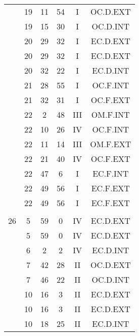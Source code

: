 \documentclass[12pt, a4paper]{article}
\begin{document}
\begin{multicols}{3}
{\begin{tabular}{c c c c c c}
	 	 	 	 & 19 & 11 & 54 & I & OC.D.EXT\\%
	 	 	 	 & 19 & 15 & 30 & I & OC.D.INT\\%
	 	 	 	 & 20 & 29 & 32 & I & EC.D.EXT\\%
	 	 	 	 & 20 & 29 & 32 & I & EC.D.EXT\\%
	 	 	 	 & 20 & 32 & 22 & I & EC.D.INT\\%
	 	 	 	 & 21 & 28 & 55 & I & OC.F.INT\\%
	 	 	 	 & 21 & 32 & 31 & I & OC.F.EXT\\%
	 	 	 	 & 22 & 2 & 48 & III & OM.F.INT\\%
	 	 	 	 & 22 & 10 & 26 & IV & OC.F.INT\\%
	 	 	 	 & 22 & 11 & 14 & III & OM.F.EXT\\%
	 	 	 	 & 22 & 21 & 40 & IV & OC.F.EXT\\%
	 	 	 	 & 22 & 47 & 6 & I & EC.F.INT\\%
	 	 	 	 & 22 & 49 & 56 & I & EC.F.EXT\\%
	 	 	 	 & 22 & 49 & 56 & I & EC.F.EXT\\%
	 	 	 	 & & & & & \\%
	 	 	 	26 & 5 & 59 & 0 & IV & EC.D.EXT\\%
	 	 	 	 & 5 & 59 & 0 & IV & EC.D.EXT\\%
	 	 	 	 & 6 & 2 & 2 & IV & EC.D.INT\\%
	 	 	 	 & 7 & 42 & 28 & II & OC.D.EXT\\%
	 	 	 	 & 7 & 46 & 22 & II & OC.D.INT\\%
	 	 	 	 & 10 & 16 & 3 & II & EC.D.EXT\\%
	 	 	 	 & 10 & 16 & 3 & II & EC.D.EXT\\%
	 	 	 	 & 10 & 18 & 25 & II & EC.D.INT\\%

\end{tabular}}
\end{multicols}
\end{document}
